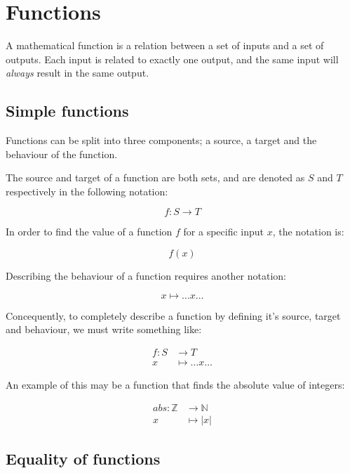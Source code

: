 
\section*{Functions}

A mathematical function is a relation between a set of inputs and a set of
outputs. Each input is related to exactly one output, and the same input will
{\it always} result in the same output.

\subsection*{Simple functions}

Functions can be split into three components; a source, a target and the
behaviour of the function.

The source and target of a function are both sets, and are denoted as $S$ and
$T$ respectively in the following notation:

\[
	f:S \rightarrow T
\]

In order to find the value of a function $f$ for a specific input $x$, the
notation is:

\[
	f(x)
\]

Describing the behaviour of a function requires another notation:

\[
	x \longmapsto \dots x \dots
\]

Concequently, to completely describe a function by defining it's source, target
and behaviour, we must write something like:

\[
	\begin{split}
	f:S &\rightarrow T\\
	x &\longmapsto \dots x \dots
	\end{split}
\]

An example of this may be a function that finds the absolute value of integers:

\[
	\begin{split}
	abs:\mathbb{Z} &\rightarrow \mathbb{N}\\
	x &\longmapsto |x|
	\end{split}	
\]

\subsection*{Equality of functions}

